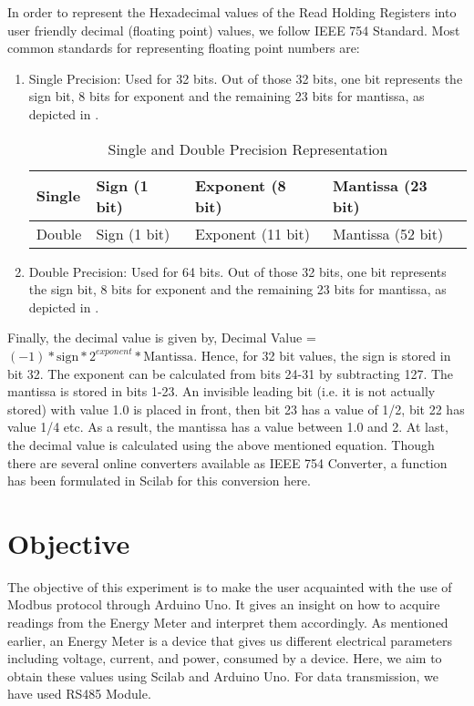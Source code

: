 In order to represent the Hexadecimal values of the Read Holding
Registers into user friendly decimal (floating point) values, we
follow IEEE 754 Standard. Most common standards for representing
floating point numbers are:
\begin{enumerate}
\item Single Precision: Used for 32 bits. Out of those 32 bits, one
  bit represents the sign bit, 8 bits for exponent and the remaining
  23 bits for mantissa, as depicted in .

\begin{table}
\centering
\caption{Single and Double Precision Representation}
\label{tab:single-precision}
\begin{tabular}{|l|l|l|l|}
\hline
Single & Sign (1 bit) & Exponent (8 bit) & Mantissa (23 bit) \\ \hline 
Double & Sign (1 bit) & Exponent (11 bit) & Mantissa (52 bit) \\ \hline
\end{tabular}
\end{table}
\item Double Precision: Used for 64 bits. Out of those 32 bits, one bit represents the sign bit, 8 bits for exponent and the remaining 23 bits for mantissa, as depicted in .
\end{enumerate}
Finally, the decimal value is given by, 
Decimal Value = $( - 1) * \text{sign} * 2^{exponent}* \text{Mantissa}$.
Hence, for 32 bit values, the sign is stored in bit 32. The exponent
can be calculated from bits 24-31 by subtracting 127. The mantissa is
stored in bits 1-23. An invisible leading bit (i.e. it is not actually
stored) with value 1.0 is placed in front, then bit 23 has a value of
1/2, bit 22 has value 1/4 etc. As a result, the mantissa has a value
between 1.0 and 2. At last, the decimal value is calculated using the
above mentioned equation. Though there are several online converters
available as IEEE 754 Converter, a function has been formulated in
Scilab for this conversion here.  


\section{Objective}
The objective of this experiment is to make the user acquainted with
the use of Modbus protocol through Arduino Uno. It gives an insight on
how to acquire readings from the Energy Meter and interpret them
accordingly. As mentioned earlier, an Energy Meter is a device that
gives us different electrical parameters including voltage, current,
and power, consumed by a device. Here, we aim to obtain these values
using Scilab and Arduino Uno. For data transmission, we have used
RS485 Module.

